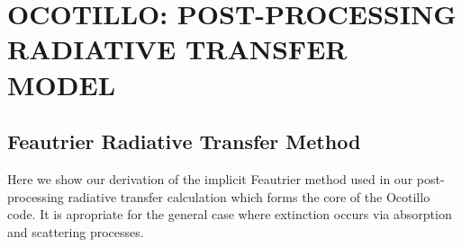 \section{\texorpdfstring{\MakeUppercase{ocotillo: post-processing radiative transfer model}}{ocotillo: post-processing radiative  transfer model}}
\label{sec:Appendix-RTModel}


\subsection{Feautrier Radiative Transfer Method}
\label{sec:Apdx-Feautrier}

Here we show our derivation of the implicit Feautrier method used in our post-processing radiative transfer calculation which forms the core of the Ocotillo code.
It is apropriate for the general case where extinction occurs via absorption and scattering processes.

